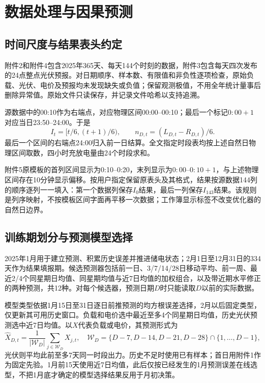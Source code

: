 \section{数据处理与因果预测}

\subsection{时间尺度与结果表头约定}

附件2和附件4包含2025年365天、每天144个时刻的数据，附件3包含每天四次发布的24点整点光伏预报。对日期顺序、样本数、有限值和非负性逐项检查，原始负载、光伏、电价及预报均未发现缺失或负值；保留观测极值，不用全年统计量事后删除异常值。原始文件只读保存，并记录文件哈希以支持追溯。

源数据中的00:10作为右端点，对应物理区间00:00--00:10；最后一个标记$0{:}00{+}1$对应当日23:50--24:00。于是
\begin{equation}
 I_t=[t/6,(t+1)/6),\qquad
 n_{D,t}=(L_{D,t}-R_{D,t})/6.
 \label{eq:time_energy}
\end{equation}
最后一个区间的右端点24:00归入前一日结算。全文指定时段表均按上述自然日物理区间取数，四小时充放电量由24个时段求和。

附件5原模板的首列区间显示为0:10--0:20，末列显示为$0{:}00$--$0{:}10{+}1$，与上述物理区间存在10分钟显示偏移。按用户指定保留原表头及其格式，结果按源数据144列的顺序逐列一一填入：第一个数据列保存$I_0$结果，最后一列保存$I_{143}$结果。该规则是列序映射，不按模板区间字面再平移一次数据；工作簿显示标签不改变优化器的自然日边界。

\subsection{训练期划分与预测模型选择}

2025年1月用于建立预测、积累历史误差并推进储电状态；2月1日至12月31日的334天作为结果填报期。候选预测器包括前一日、3/7/14/28日移动平均、前一周、最近2/4个同星期日均值、同星期均值与近7日均值的加权组合，以及带近期水平修正的两种预测，共12种。对每个候选器，预测日期$D$时只能读取$D$以前的实际数据。

模型类型依据1月15日至31日逐日前推预测的均方根误差选择，2月以后固定类型，仅更新其可用历史窗口。负载和电价选中最近至多4个同星期日均值，历史光伏预测选中近7日均值。以$X$代表负载或电价，其预测形式为
\begin{equation}
 \widehat X_{D,t}=\frac{1}{|\mathcal W_D|}\sum_{j\in\mathcal W_D}X_{j,t},
 \quad \mathcal W_D=\{D-7,D-14,D-21,D-28\}\cap\{1,\ldots,D-1\},
 \label{eq:weekday_forecast}
\end{equation}
光伏则平均此前至多7天同一时段出力。历史不足时使用已有样本；首日用附件1作为固定先验。1月前15天使用近7日均值，此后仅按已经发生的1月预测误差在线选型，不把1月底才确定的模型选择结果反用于月初决策。

